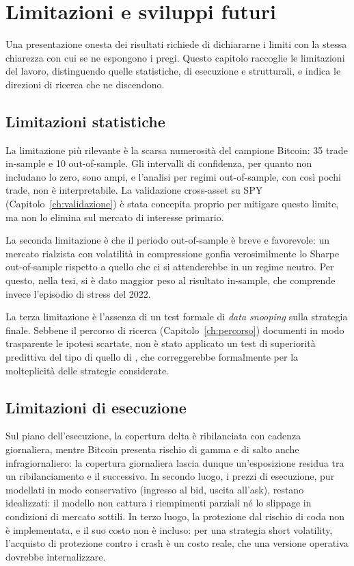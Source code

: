 \chapter{Limitazioni e sviluppi futuri}
\label{ch:limitazioni}

Una presentazione onesta dei risultati richiede di dichiararne i limiti con
la stessa chiarezza con cui se ne espongono i pregi. Questo capitolo
raccoglie le limitazioni del lavoro, distinguendo quelle statistiche, di
esecuzione e strutturali, e indica le direzioni di ricerca che ne
discendono.

\section{Limitazioni statistiche}
\label{sec:lim-statistiche}

La limitazione più rilevante è la scarsa numerosità del campione Bitcoin: 35
trade in-sample e 10 out-of-sample. Gli intervalli di confidenza, per quanto
non includano lo zero, sono ampi, e l'analisi per regimi out-of-sample, con
così pochi trade, non è interpretabile. La validazione cross-asset su SPY
(Capitolo~\ref{ch:validazione}) è stata concepita proprio per mitigare
questo limite, ma non lo elimina sul mercato di interesse primario.

La seconda limitazione è che il periodo out-of-sample è breve e favorevole:
un mercato rialzista con volatilità in compressione gonfia verosimilmente lo
Sharpe out-of-sample rispetto a quello che ci si attenderebbe in un regime
neutro. Per questo, nella tesi, si è dato maggior peso al risultato
in-sample, che comprende invece l'episodio di stress del 2022.

La terza limitazione è l'assenza di un test formale di \emph{data snooping}
sulla strategia finale. Sebbene il percorso di ricerca
(Capitolo~\ref{ch:percorso}) documenti in modo trasparente le ipotesi
scartate, non è stato applicato un test di superiorità predittiva del tipo
di quello di \citet{hansen2005test}, che correggerebbe formalmente per la
molteplicità delle strategie considerate.

\section{Limitazioni di esecuzione}
\label{sec:lim-esecuzione}

Sul piano dell'esecuzione, la copertura delta è ribilanciata con cadenza
giornaliera, mentre Bitcoin presenta rischio di gamma e di salto anche
infragiornaliero: la copertura giornaliera lascia dunque un'esposizione
residua tra un ribilanciamento e il successivo. In secondo luogo, i prezzi
di esecuzione, pur modellati in modo conservativo (ingresso al bid, uscita
all'ask), restano idealizzati: il modello non cattura i riempimenti parziali
né lo slippage in condizioni di mercato sottili. In terzo luogo, la
protezione dal rischio di coda non è implementata, e il suo costo non è
incluso: per una strategia short volatility, l'acquisto di protezione contro
i crash è un costo reale, che una versione operativa dovrebbe internalizzare.

